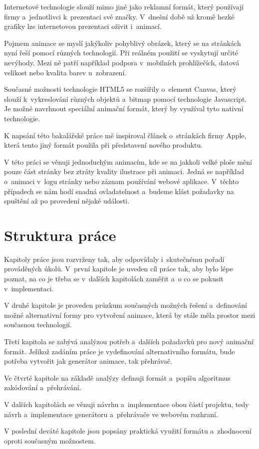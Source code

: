\begin{introduction}

Internetové technologie slouží mimo jiné jako reklamní formát, který používají firmy a~jednotlivci k~prezentaci své značky. V~dnešní době už kromě hezké grafiky lze internetovou prezentaci oživit i~animací.

Pojmem animace se myslí jakýkoliv pohyblivý obrázek, který se na stránkách nyní řeší pomocí různých technologií. Při reálném použití se vyskytují určité nevýhody. Mezi ně patří například podpora v~mobilních prohlížečích, datová velikost nebo kvalita barev u~zobrazení. 

Současné možnosti technologie HTML5 se rozšířily o~element Canvas, který slouží k~vykreslování různých objektů a~bitmap pomocí technologie Javascript. Je možné navrhnout speciální animační formát, který by využíval tyto nativní technologie.

K napsání této bakalářské práce mě inspiroval článek\cite{appleWebsite} o~stránkách firmy Apple\cite{apple}, která tento jiný formát použila\cite{engadget} při představení nového produktu.

V této práci se věnuji jednoduchým animacím, kde se na jakkoli velké ploše mění pouze část stránky bez ztráty kvality ilustrace při animaci. Jedná se například o~animaci v~logu stránky nebo záznam používání webové aplikace. V~těchto případech se nám hodí snadná ovladatelnost a~budeme klást požadavky na spuštění až po provedení nějaké události.


\section{Struktura práce}

Kapitoly práce jsou rozvrženy tak, aby odpovídaly i~skutečnému pořadí prováděných úkolů. V~první kapitole je uveden cíl práce tak, aby bylo lépe poznat, na co je třeba se v~dalších kapitolách zaměřit a~o co se pokusit v~implementaci. 

V druhé kapitole je proveden průzkum současných možných řešení a~definování možné alternativní formy pro vytvoření animace, která by stále měla prostor mezi současnou technologií.

Třetí kapitola se zabývá analýzou potřeb a~dalších požadavků pro nový animační formát. Jelikož zadáním práce je vydefinování alternativního formátu, bude potřeba vytvořit jak generátor animace, tak přehrávač.

Ve čtvrté kapitole na základě analýzy definuji formát a~popíšu algoritmus zakódování a~přehrávání. 

V dalších kapitolách se věnuji návrhu a~implementace obou částí projektu, tedy návrh a~implementace generátoru a~přehrávače ve webovém rozhraní. 

V poslední deváté kapitole jsou popsány praktická využití formátu a~zhodnocení oproti současným možnostem.


\end{introduction}
